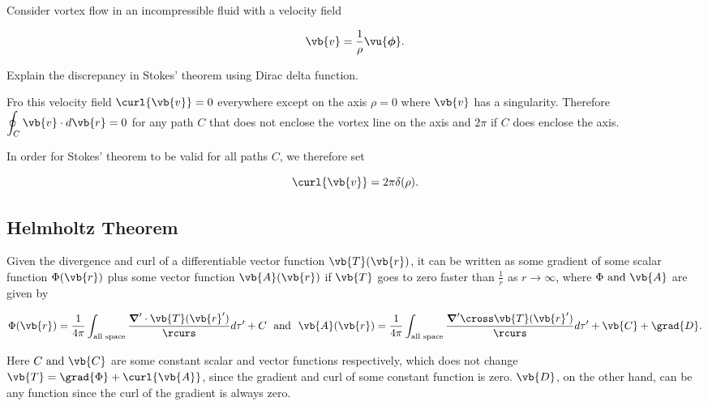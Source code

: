 \documentclass[english,a4paper,12pt]{report}
\begin{document}
{Consider vortex flow in an incompressible fluid with a velocity field

\begin{equation}
	\vb{v} = \frac{1}{\rho } \vu{\boldsymbol{\phi } }. 
\end{equation}

Explain the discrepancy in Stokes' theorem using Dirac delta function.
}
{Fro this velocity field \(\curl{\vb{v} } =0\) everywhere except on the axis \(\rho =0\) where \(\vb{v}\) has a singularity. Therefore \(\displaystyle \oint_{C} \vb{v} \cdot d\vb{r} =0\) for any path \(C\) that does not enclose the vortex line on the axis and \(2\pi \) if \(C\) does enclose the axis.

In order for Stokes' theorem to be valid for all paths \(C\), we therefore set 

\begin{equation}
	\curl{\vb{v} } = 2\pi \delta (\rho ).
\end{equation}

} 


	
\subsection{Helmholtz Theorem}

\begin{theorem}
Given the divergence and curl of a differentiable vector function \(\vb{T}(\vb{r} ) \), it can be written as some gradient of some scalar function \(\Phi(\vb{r} ) \) plus some vector function \(\vb{A}(\vb{r} ) \) if \(\vb{T} \) goes to zero faster than \(\displaystyle \frac{1}{r} \) as \(r \to \infty\), where \(\Phi \text { and } \vb{A} \) are given by

\begin{equation}
	\Phi(\vb{r} ) = \frac{1}{4\pi } \int_{\text{all space} } \frac{\boldsymbol{\nabla}' \cdot \vb{T} (\vb{r} ')}{\rcurs } d\tau ' + C~\text { and }~ \vb{A} (\vb{r} ) = \frac{1}{4\pi } \int_{\text{all space} } \frac{\boldsymbol{\nabla}' \cross \vb{T} (\vb{r} ')}{\rcurs } d\tau ' + \vb{C} + \grad{D} .
\end{equation}

Here \(C \text { and }  \vb{C} \) are some constant scalar and vector functions respectively, which does not change \(\vb{T} = \grad{\Phi } + \curl{\vb{A} }\), since the gradient and curl of some constant function is zero. \(\vb{D}\), on the other hand, can be any function since the curl of the gradient is always zero. 

\end{theorem}
\end{document}
